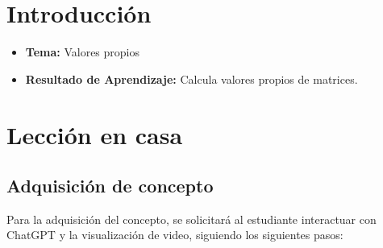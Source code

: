 \documentclass[a4,11pt]{aleph-notas}
\begin{document}
\encabezado


\section*{Introducción}

\begin{itemize}
    \item \textbf{Tema:} Valores propios
    \item \textbf{Resultado de Aprendizaje:} Calcula valores propios de matrices.
\end{itemize}

\section{Lección en casa}

\subsection{Adquisición de concepto}

Para la adquisición del concepto, se solicitará al estudiante interactuar con ChatGPT y la visualización de video, siguiendo los siguientes pasos:
\end{document}
